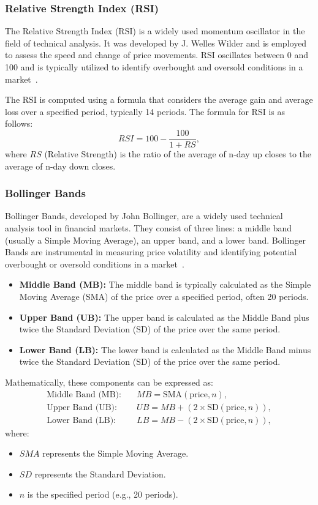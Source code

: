 \documentclass[10pt,twocolumn,letterpaper]{article}
\begin{document}
\subsubsection{Relative Strength Index (RSI)}

The Relative Strength Index (RSI) is a widely used momentum oscillator in the field of technical analysis. It was developed by J. Welles Wilder and is employed to assess the speed and change of price movements. RSI oscillates between 0 and 100 and is typically utilized to identify overbought and oversold conditions in a market~\cite{PoonGranger,Psaradellis}.

The RSI is computed using a formula that considers the average gain and average loss over a specified period, typically 14 periods. The formula for RSI is as follows:
\[ RSI = 100 - \frac{100}{1 + RS},\]
where \(RS\) (Relative Strength) is the ratio of the average of n-day up closes to the average of n-day down closes.

\subsubsection{Bollinger Bands}

Bollinger Bands, developed by John Bollinger, are a widely used technical analysis tool in financial markets. They consist of three lines: a middle band (usually a Simple Moving Average), an upper band, and a lower band. Bollinger Bands are instrumental in measuring price volatility and identifying potential overbought or oversold conditions in a market~\cite{PoonGranger,JarenoGarcia}.
\begin{itemize}
   \item \textbf{Middle Band (MB):} The middle band is typically calculated as the Simple Moving Average (SMA) of the price over a specified period, often 20 periods.
   \item \textbf{Upper Band (UB):} The upper band is calculated as the Middle Band plus twice the Standard Deviation (SD) of the price over the same period.
   \item \textbf{Lower Band (LB):} The lower band is calculated as the Middle Band minus twice the Standard Deviation (SD) of the price over the same period.
\end{itemize}
Mathematically, these components can be expressed as:
\begin{align*}
   \text{Middle Band (MB):} & \quad MB = \text{SMA}(\text{price}, n),                \\
   \text{Upper Band (UB):}  & \quad UB = MB + (2 \times \text{SD}(\text{price}, n)), \\
   \text{Lower Band (LB):}  & \quad LB = MB - (2 \times \text{SD}(\text{price}, n)),
\end{align*}
where:
\begin{itemize}
   \item \(SMA\) represents the Simple Moving Average.
   \item \(SD\) represents the Standard Deviation.
   \item \(n\) is the specified period (e.g., 20 periods).
\end{itemize}
\end{document}
